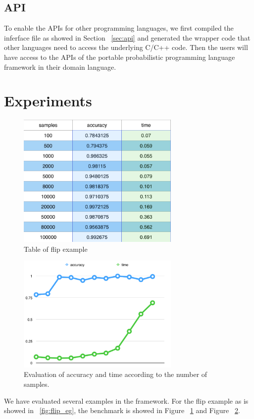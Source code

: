 \subsection{API}
To enable the APIs for other programming languages, we first compiled the inferface file as showed in Section ~\ref{sec:api} and generated the wrapper code that other languages need to access the underlying C/C++ code. Then the users will have access to the APIs of the portable probabilistic programming language framework in their domain language. 

\section{Experiments}
\begin{figure}
    \centering
    \includegraphics[width=0.7\textwidth]{figures/flip_eval1.png}
    \caption{Table of flip example}
    \label{fig:flip_eval1}
\end{figure}

\begin{figure}
    \centering
    \includegraphics[width=0.7\textwidth]{figures/flip_eval2.png}
    \caption{Evaluation of accuracy and time according to the number of samples.}
    \label{fig:flip_eval2}
\end{figure}
We have evaluated several examples in the framework. 
For the flip example as is showed in ~\ref{fig:flip_eg}, the benchmark is showed in Figure ~\ref{fig:flip_eval1} and Figure ~\ref{fig:flip_eval2}.
